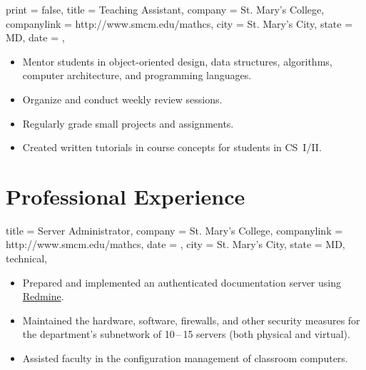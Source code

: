 \documentclass{simplecv}
\begin{document}
\begin{position}
  {
    print   = false,
    title   = Teaching Assistant,
    company = St. Mary's College,
    companylink = http://www.smcm.edu/mathcs,
    city    = St. Mary's City,
    state   = MD,
    date    = ,
  }

\begin{itemize}
\item Mentor students in object-oriented design, data structures, algorithms, computer architecture, and programming languages.
\item Organize and conduct weekly review sessions.
\item Regularly grade small projects and assignments.
\item Created written tutorials in course concepts for students in CS~I\slash II.
\end{itemize}
\end{position}

\vfill
\section{Professional Experience}

\begin{position}
  {
    title   = Server Administrator,
    company = St. Mary's College,
    companylink = http://www.smcm.edu/mathcs,
    date    = ,
    city    = St. Mary's City,
    state   = MD,
    technical,
  }

\begin{itemize}
\item Prepared and implemented an authenticated documentation server using \href{http://www.redmine.org}{Redmine}.
\item Maintained the hardware, software, firewalls, and other security measures
  for the department's subnetwork of 10\,--\,15 servers (both physical and virtual).
\item Assisted faculty in the configuration management of classroom computers.
\end{itemize}
\end{position}
\end{document}
